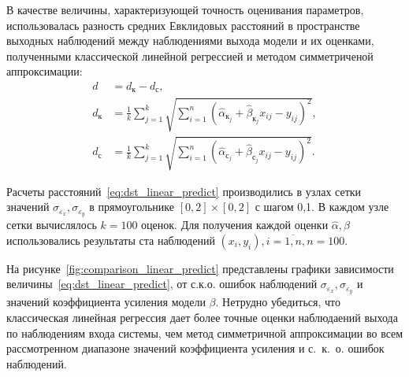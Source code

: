 В качестве величины, характеризующей точность оценивания параметров,
использовалась разность средних Евклидовых расстояний в пространстве выходных наблюдений
между наблюдениями выхода модели и их оценками,
полученными классической линейной регрессией и методом симметриченой аппроксимации:
\begin{equation}
  \begin{aligned}
    d &= d_{\text{к}} - d_{\text{с}}, \\
    d_{\text{к}} &= \frac{1}{k} \sum_{j=1}^k \sqrt{ \sum_{i=1}^n (\hat{\alpha}_{\text{к}_j} + \hat{\beta}_{\text{к}_j} x_{ij} - y_{ij})^2}, \\
    d_{\text{с}} &= \frac{1}{k} \sum_{j=1}^k \sqrt{ \sum_{i=1}^n (\hat{\alpha}_{\text{с}_j} + \hat{\beta}_{\text{с}_j} x_{ij} - y_{ij})^2}.
    \end{aligned}
  \label{eq:dst_linear_predict}
\end{equation}

Расчеты расстояний~\eqref{eq:dst_linear_predict} производились в узлах сетки значений
\( \sigma_{\varepsilon_x}, \sigma_{\varepsilon_y} \) в прямоугольнике
\( [0, 2] \times [0, 2] \) с шагом 0{,}1.
В каждом узле сетки вычислялось \( k = 100 \) оценок.
Для получения каждой оценки \( \hat{\alpha}, \hat{\beta} \) использовались результаты
ста наблюдений \( ( x_i, y_i ), i = \overline{1, n}, n = 100 \).

На рисунке~\ref{fig:comparison_linear_predict} представлены графики зависимости
величины~\eqref{eq:dst_linear_predict},
от с.к.о. ошибок наблюдений \( \sigma_{\varepsilon_x}, \sigma_{\varepsilon_y} \) и
значений коэффициента усиления модели \( \beta \).
Нетрудно убедиться, что классическая линейная регрессия дает более точные оценки наблюдаений
выхода по наблюдениям входа системы, чем метод симметричной аппроксимации
во всем рассмотренном диапазоне значений коэффициента усиления и с.~к.~о. ошибок наблюдений.

